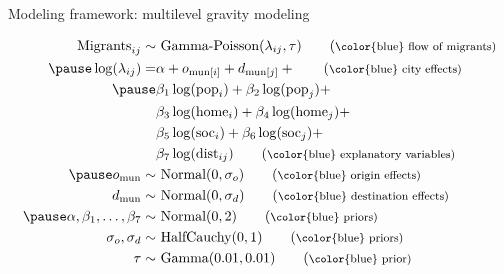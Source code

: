 \documentclass{beamer}
\begin{document}
\begin{frame}[fragile]{Modeling framework: multilevel gravity modeling}
\begin{small}
	\begin{align} \text{Migrants}_{ij} \sim & \text{ Gamma-Poisson}(\lambda_{ij}, \tau) \tag{\footnotesize \color{blue} flow of migrants} \\ \pause
	\log(\lambda_{ij}) =
	& \alpha + o_{\text{mun}[i]} + d_{\text{mun}[j]} + \tag{\footnotesize
   \color{blue} city effects}  \\ \pause
	& \beta_1 \log(\text{pop}_i) + \notag
	\beta_2\log(\text{pop}_j) + \notag \\ & \beta_3
	\log(\text{home}_i) + \beta_4 \log(\text{home}_j) + \notag\\
	& \beta_5 \log(\text{soc}_i) + \beta_6 \log(\text{soc}_j) + \notag \\ 
	& \beta_7 \log(\text{dist}_{ij})  \tag{\footnotesize \color{blue} explanatory variables}  \\ \pause
	o_{\text{mun}} \sim& \text{ Normal}(0, \sigma_o)  \tag{\footnotesize \color{blue} origin effects}  \\ 
	d_{\text{mun}} \sim& \text{ Normal}(0, \sigma_d)   \tag{\footnotesize \color{blue} destination effects}  \\ \pause
	\alpha, \beta_1,\ldots, \beta_7 \sim& \text{
		Normal}(0,2) \tag{\footnotesize \color{blue} priors} \\ 
	\sigma_o, \sigma_d \sim& \text{ HalfCauchy}(0,1) \tag{\footnotesize \color{blue} priors}  \\ 
	\tau \sim& \text{ Gamma}(0.01, 0.01)  \tag{\footnotesize \color{blue} prior}  
	\end{align}
\end{small}
\end{frame}
\end{document}

